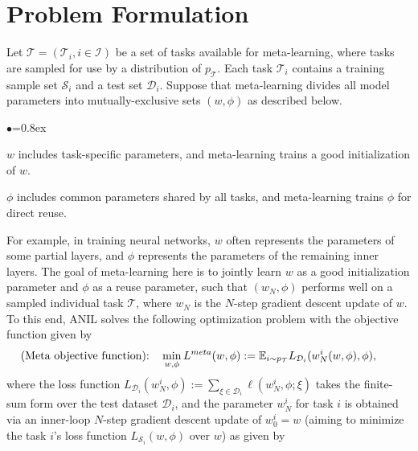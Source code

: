 \documentclass{osudissert96}
\begin{document}
\section{Problem Formulation}\label{problem}
Let $\mathcal{T}=(\mathcal{T}_i, i\in \mathcal{I})$ be a set of tasks available for meta-learning, where tasks are sampled for use by a distribution of $p_\mathcal{T}$. Each task $\mathcal{T}_i$ contains a training sample set $\mathcal{S}_i$ and a test set $\mathcal{D}_i$. Suppose that meta-learning divides all model parameters into mutually-exclusive sets $(w,\phi)$ as described below.
\begin{list}{$\bullet$}{\topsep=0.8ex \leftmargin=0.5in \rightmargin=0.1in \itemsep =0.05in}
\item $w$ includes task-specific parameters, and meta-learning trains a good initialization of $w$. 

\item $\phi$ includes common parameters shared by all tasks, and meta-learning trains $\phi$ for direct reuse. 
\end{list}
For example, in training neural networks, $w$ often represents the parameters of some partial layers,  and $\phi$ represents the parameters of the remaining inner layers.  The goal of meta-learning here is to jointly learn $w$ as a good initialization parameter and $\phi$ as a reuse parameter, such that $(w_N,\phi)$ performs well on a sampled individual task $\mathcal{T}$, where $w_N$ is the $N$-step gradient descent update of $w$. 
To this end, ANIL solves the following optimization problem with the objective function given by
\begin{align}\label{eq:obj} 
\hspace{-0.3cm}\text{(Meta objective function):}\quad & 
\min_{ w,\phi} L^{meta} ( w, \phi) := \mathbb{E}_{i\sim p_{\mathcal{T}}} L_{\mathcal{D}_i}( w^i_N( w,\phi), \phi), 
\end{align}
where the loss function $L_{\mathcal{D}_i}(w^i_N, \phi):=\sum_{\xi \in \mathcal{D}_i } \ell (w^i_N,\phi; \xi)$ takes the finite-sum form over the test dataset $\mathcal{D}_i$, and the parameter $w^i_N$  for task $i$ is obtained via an inner-loop $N$-step gradient descent update of $w^i_0=w$ (aiming to minimize the task $i$'s loss function $L_{\mathcal{S}_i}(w,\phi)$ over $w$) as given by%
\end{document}
